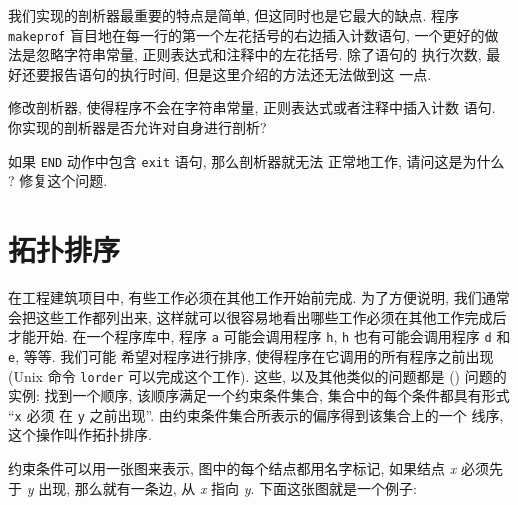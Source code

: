 我们实现的剖析器最重要的特点是简单, 但这同时也是它最大的缺点. 程序 
\texttt{makeprof} 盲目地在每一行的第一个左花括号的右边插入计数语句,
一个更好的做法是忽略字符串常量, 正则表达式和注释中的左花括号. 除了语句的
执行次数, 最好还要报告语句的执行时间, 但是这里介绍的方法还无法做到这
一点.

\begin{exercise}
    修改剖析器, 使得程序不会在字符串常量, 正则表达式或者注释中插入计数
    语句. 你实现的剖析器是否允许对自身进行剖析?
\end{exercise}

\begin{exercise}
    \label{exer:end_exit}
    如果 \texttt{END} 动作中包含 \texttt{exit} 语句, 那么剖析器就无法
    正常地工作, 请问这是为什么 ? 修复这个问题.
\end{exercise}

\section{拓扑排序}
\label{sec:topological_sorting}

在工程建筑项目中, 有些工作必须在其他工作开始前完成. 为了方便说明, 我们通常
会把这些工作都列出来, 这样就可以很容易地看出哪些工作必须在其他工作完成后
才能开始. 在一个程序库中, 程序 \texttt{a} 可能会调用程序 \texttt{h},
\texttt{h} 也有可能会调用程序 \texttt{d}  和 \texttt{e}, 等等. 我们可能
希望对程序进行排序, 使得程序在它调用的所有程序之前出现 (Unix 命令
\texttt{lorder} 可以完成这个工作). 这些, 以及其他类似的问题都是
 () 问题的实例: 找到一个顺序,
该顺序满足一个约束条件集合, 集合中的每个条件都具有形式 ``\texttt{x} 必须
在 \texttt{y} 之前出现''. 由约束条件集合所表示的偏序得到该集合上的一个
线序, 这个操作叫作拓扑排序.

约束条件可以用一张图来表示, 图中的每个结点都用名字标记, 如果结点 \textit{x}
必须先于 \textit{y} 出现, 那么就有一条边, 从 \textit{x} 指向 \textit{y}.
下面这张图就是一个例子:
\begin{center}
\end{center}

